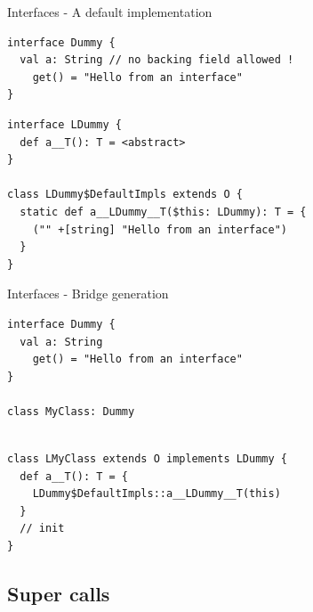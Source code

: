 \documentclass[10pt]{beamer}
\begin{document}
\begin{frame}[fragile]{Interfaces - A default implementation}
 \begin{verbatim}
interface Dummy {
  val a: String // no backing field allowed !
    get() = "Hello from an interface"
}
 \end{verbatim}
 
 \begin{verbatim}
interface LDummy {
  def a__T(): T = <abstract>
}

class LDummy$DefaultImpls extends O {
  static def a__LDummy__T($this: LDummy): T = {
    ("" +[string] "Hello from an interface")
  }
}
 \end{verbatim}


\end{frame}


\begin{frame}[fragile]{Interfaces - Bridge generation}

 \begin{verbatim}
interface Dummy {
  val a: String
    get() = "Hello from an interface"
}

class MyClass: Dummy
 \end{verbatim}
 
 \begin{verbatim}

class LMyClass extends O implements LDummy {
  def a__T(): T = {
    LDummy$DefaultImpls::a__LDummy__T(this)
  }
  // init
}
 \end{verbatim}
 
\end{frame}


\subsection{Super calls}
\end{document}
